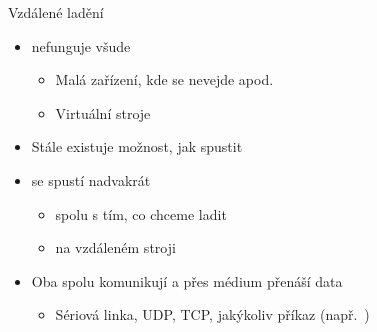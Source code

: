 \begin{frame}{Vzdálené ladění}

  \begin{itemize}
    \item {} nefunguje všude
    \begin{itemize}
      \item Malá zařízení, kde se  nevejde apod.
      \item Virtuální stroje
    \end{itemize}

    \pause

    \item Stále existuje možnost, jak  spustit

    \pause

    \item {} se spustí nadvakrát
    \begin{itemize}
      \item {} spolu s tím, co chceme ladit
      \item {} na vzdáleném stroji
    \end{itemize}

    \pause

    \item Oba spolu komunikují a přes médium přenáší data
    \begin{itemize}
      \item Sériová linka, UDP, TCP, jakýkoliv příkaz (např.\ )
    \end{itemize}
  \end{itemize}

\end{frame}

